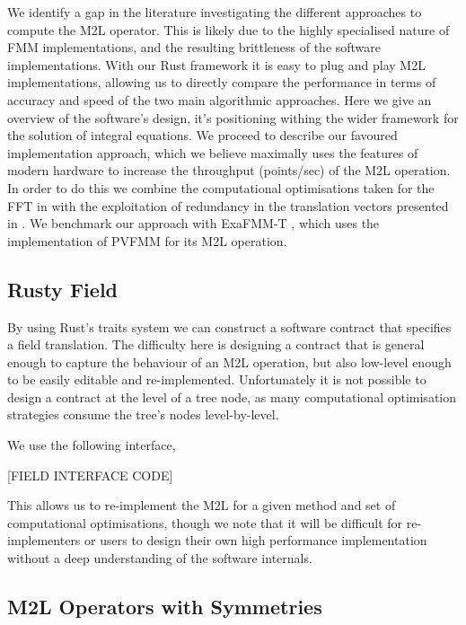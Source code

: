 \documentclass[12pt, a4, twoside]{article}
\begin{document}
We identify a gap in the literature investigating the different approaches to compute the M2L operator. This is likely due to the highly specialised nature of FMM implementations, and the resulting brittleness of the software implementations. With our Rust framework it is easy to plug and play M2L implementations, allowing us to directly compare the performance in terms of accuracy and speed of the two main algorithmic approaches. Here we give an overview of the software's design, it's positioning withing the wider framework for the solution of integral equations. We proceed to describe our favoured implementation approach, which we believe maximally uses the features of modern hardware to increase the throughput (points/sec) of the M2L operation. In order to do this we combine the computational optimisations taken for the FFT in \cite{Malhotra2015} with the exploitation of redundancy in the translation vectors presented in \cite{Messner2012}. We benchmark our approach with ExaFMM-T \cite{wang2021exafmm}, which uses the implementation of PVFMM for its M2L operation. 

\subsection{Rusty Field}

By using Rust's traits system we can construct a software contract that specifies a field translation. The difficulty here is designing a contract that is general enough to capture the behaviour of an M2L operation, but also low-level enough to be easily editable and re-implemented. Unfortunately it is not possible to design a contract at the level of a tree node, as many computational optimisation strategies consume the tree's nodes level-by-level.

We use the following interface,


[FIELD INTERFACE CODE]


This allows us to re-implement the M2L for a given method and set of computational optimisations, though we note that it will be difficult for re-implementers or users to design their own high performance implementation without a deep understanding of the software internals.

\subsection{M2L Operators with Symmetries}
\end{document}
